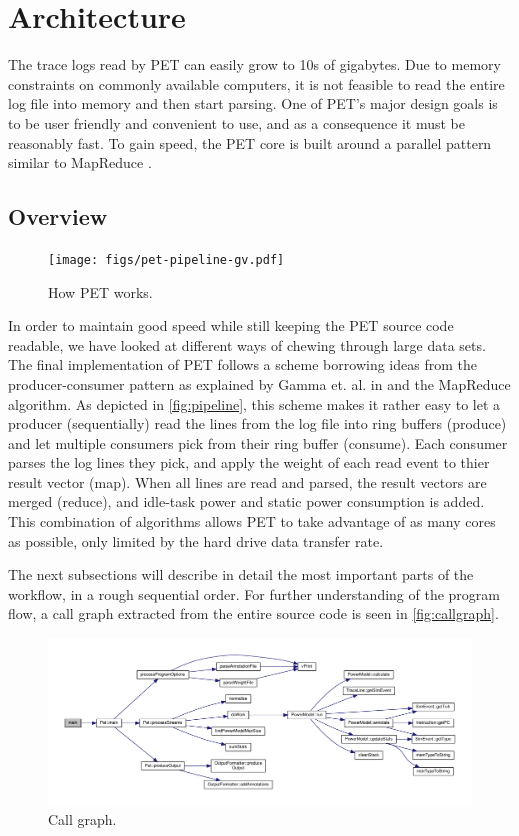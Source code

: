 \section{Architecture}

The trace logs read by PET can easily grow to 10s of gigabytes. Due to memory
constraints on commonly available computers, it is not feasible to read the
entire log file into memory and then start parsing. One of PET's major design
goals is to be user friendly and convenient to use, and as a consequence it must
be reasonably fast. To gain speed, the PET core is built around a parallel
pattern similar to MapReduce \cite{dean2008mapreduce}.


\subsection{Overview}

\begin{figure}[ht]
    \texttt{[image: figs/pet-pipeline-gv.pdf]}
    \caption{How PET works.}
    \label{fig:pipeline}
\end{figure}

In order to maintain good speed while still keeping the PET source code
readable, we have looked at different ways of chewing through large data sets.
The final implementation of PET follows a scheme borrowing ideas from the
producer-consumer pattern as explained by Gamma et. al. in \cite{designpatterns}
and the MapReduce algorithm. As depicted in \autoref{fig:pipeline}, this scheme
makes it rather easy to let a producer (sequentially) read the lines from the
log file into ring buffers (produce) and let multiple consumers pick from their
ring buffer (consume). Each consumer parses the log lines they pick, and apply
the weight of each read event to thier result vector (map). When all lines are
read and parsed, the result vectors are merged (reduce), and idle-task power and
static power consumption is added. This combination of algorithms allows PET to
take advantage of as many cores as possible, only limited by the hard drive data
transfer rate.

The next subsections will describe in detail the most important parts of the
workflow, in a rough sequential order. For further understanding of the program
flow, a call graph extracted from the entire source code is seen in
\autoref{fig:callgraph}.

\begin{figure}
    \includegraphics[width=\textwidth]{figs/maincallgraph.pdf}
    \caption{Call graph.}
    \label{fig:callgraph}
\end{figure}


